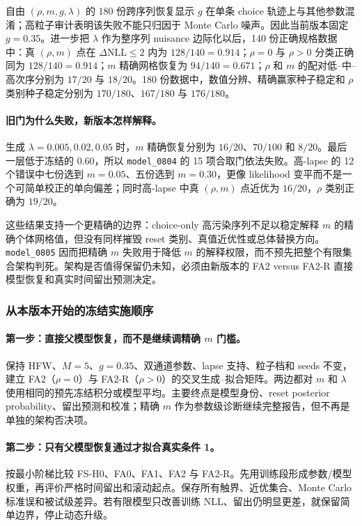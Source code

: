 自由 $(\rho,m,g,\lambda)$ 的 180 份跨序列恢复显示 $g$ 在单条 choice 轨迹上与其他参数混淆；高粒子审计表明该失败不能只归因于 Monte Carlo 噪声。因此当前版本固定 $g=0.35$。进一步把 $\lambda$ 作为整序列 nuisance 边际化以后，140 份正确规格数据中：真 $(\rho,m)$ 点在 $\Delta\mathrm{NLL}\leq2$ 内为 $128/140=0.914$；$\rho=0$ 与 $\rho>0$ 分类正确同为 $128/140=0.914$；$m$ 精确网格恢复为 $94/140=0.671$；$\rho$ 和 $m$ 的配对低--中--高次序分别为 $17/20$ 与 $18/20$。180 份数据中，数值分辨、精确赢家种子稳定和 $\rho$ 类别种子稳定分别为 $170/180$、$167/180$ 与 $176/180$。

\paragraph{旧门为什么失败，新版本怎样解释。}
生成 $\lambda=0.005,0.02,0.05$ 时，$m$ 精确恢复分别为 $16/20$、$70/100$ 和 $8/20$。最后一层低于冻结的 $0.60$，所以 \texttt{model\_0804} 的 15 项合取门依法失败。高-lapse 的 12 个错误中七份选到 $m=0.05$、五份选到 $m=0.30$，更像 likelihood 变平而不是一个可简单校正的单向偏差；同时高-lapse 中真 $(\rho,m)$ 点近优为 $16/20$，$\rho$ 类别正确为 $19/20$。

这些结果支持一个更精确的边界：choice-only 高污染序列不足以稳定解释 $m$ 的精确个体网格值，但没有同样摧毁 reset 类别、真值近优性或总体替换方向。\texttt{model\_0805} 因而把精确 $m$ 失败用于降低 $m$ 的解释权限，而不预先把整个有限集合架构判死。架构是否值得保留仍未知，必须由新版本的 FA2 versus FA2-R 直接模型恢复和真实时间留出预测决定。


\subsubsection{从本版本开始的冻结实施顺序}

\paragraph{第一步：直接父模型恢复，而不是继续调精确 $m$ 门槛。}
保持 HFW、$M=5$、$g=0.35$、双通道参数、lapse 支持、粒子档和 seeds 不变，建立 FA2（$\rho=0$）与 FA2-R（$\rho>0$）的交叉生成--拟合矩阵。两边都对 $m$ 和 $\lambda$ 使用相同的预先冻结积分或模型平均。主要终点是模型身份、reset posterior probability、留出预测和校准；精确 $m$ 作为参数级诊断继续完整报告，但不再是单独的架构否决项。

\paragraph{第二步：只有父模型恢复通过才拟合真实条件 1。}
按最小阶梯比较 FS-H0、FA0、FA1、FA2 与 FA2-R。先用训练段形成参数/模型权重，再评价严格时间留出和滚动起点。保存所有触界、近优集合、Monte Carlo 标准误和被试级差异。若有限模型只改善训练 NLL、留出仍明显更差，就保留简单边界，停止动态升级。

